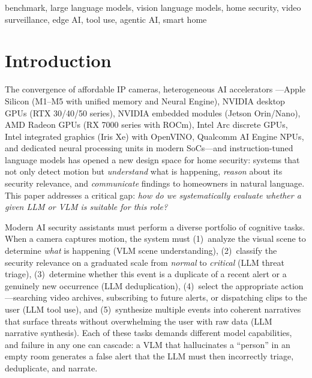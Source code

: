 \documentclass[onecolumn,10pt]{IEEEtran}
\begin{document}
\begin{IEEEkeywords}
benchmark, large language models, vision language models, home security,
video surveillance, edge AI, tool use, agentic AI, smart home
\end{IEEEkeywords}


\section{Introduction}

The convergence of affordable IP cameras, heterogeneous AI accelerators
---Apple Silicon (M1--M5 with unified memory and Neural Engine), NVIDIA
desktop GPUs (RTX 30/40/50 series), NVIDIA embedded modules (Jetson
Orin/Nano), AMD Radeon GPUs (RX 7000 series with ROCm), Intel Arc
discrete GPUs, Intel integrated graphics (Iris Xe) with OpenVINO,
Qualcomm AI Engine NPUs, and dedicated neural processing units in
modern SoCs---and instruction-tuned language models
has opened a new design space for home security: systems that not only
detect motion but \emph{understand} what is happening, \emph{reason}
about its security relevance, and \emph{communicate} findings to
homeowners in natural language. This paper addresses a critical gap:
\emph{how do we systematically evaluate whether a given LLM or VLM is
suitable for this role?}

Modern AI security assistants must perform a diverse portfolio of
cognitive tasks. When a camera captures motion, the system must
(1)~analyze the visual scene to determine \emph{what} is happening
(VLM scene understanding), (2)~classify the security relevance on a
graduated scale from \emph{normal} to \emph{critical} (LLM threat
triage), (3)~determine whether this event is a duplicate of a recent
alert or a genuinely new occurrence (LLM deduplication),
(4)~select the appropriate action---searching video archives,
subscribing to future alerts, or dispatching clips to the user (LLM
tool use), and (5)~synthesize multiple events into coherent narratives
that surface threats without overwhelming the user with raw data
(LLM narrative synthesis). Each of these tasks demands different model
capabilities, and failure in any one can cascade: a VLM that hallucinates
a ``person'' in an empty room generates a false alert that the LLM must
then incorrectly triage, deduplicate, and narrate.
\end{document}
